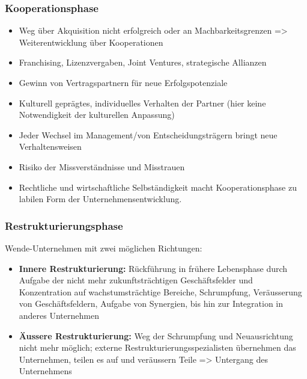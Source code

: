\subsubsection{Kooperationsphase}
\begin{itemize}
	\item Weg über Akquisition nicht erfolgreich oder an Machbarkeitsgrenzen => Weiterentwicklung über Kooperationen
	\item Franchising, Lizenzvergaben, Joint Ventures, strategische Allianzen
	\item Gewinn von Vertragspartnern für neue Erfolgspotenziale
	\item Kulturell geprägtes, individuelles Verhalten der Partner (hier keine Notwendigkeit der kulturellen Anpassung)
	\item Jeder Wechsel im Management/von Entscheidungsträgern bringt neue Verhaltensweisen
	\item Risiko der Missverständnisse und Misstrauen
	\item Rechtliche und wirtschaftliche Selbständigkeit macht Kooperationsphase zu labilen Form der Unternehmensentwicklung.
\end{itemize}

\subsubsection{Restrukturierungsphase}
Wende-Unternehmen mit zwei möglichen Richtungen:
\begin{itemize}
	\item \textbf{Innere Restrukturierung:} Rückführung in frühere Lebensphase durch Aufgabe der nicht mehr zukunftsträchtigen Geschäftsfelder und Konzentration auf wachstumsträchtige Bereiche, Schrumpfung, Veräusserung von
	Geschäftsfeldern, Aufgabe von Synergien, bis hin zur Integration in anderes Unternehmen
	\item \textbf{Äussere Restrukturierung:} Weg der Schrumpfung und Neuausrichtung nicht mehr möglich; externe Restrukturierungsspezialisten übernehmen das Unternehmen, teilen es auf und veräussern Teile => Untergang des Unternehmens
\end{itemize}